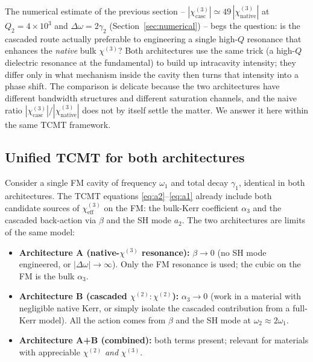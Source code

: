 \documentclass[11pt,a4paper]{article}
\newcommand{\chitwo}{\chi^{(2)}}
\newcommand{\chithree}{\chi^{(3)}}
\newcommand{\Dom}{\Delta\omega}
\begin{document}
The numerical estimate of the previous section -- $|\chithree_\text{casc}|
\simeq 49\,|\chithree_\text{native}|$ at $Q_2=4{\times}10^{3}$ and
$\Dom=2\gamma_2$ (Section~\ref{sec:numerical}) -- begs
the question: is the cascaded route actually preferable to engineering
a single high-$Q$ resonance that enhances the \emph{native} bulk
$\chithree$?  Both architectures use the same trick (a high-$Q$
dielectric resonance at the fundamental) to build up intracavity
intensity; they differ only in what mechanism inside the cavity then
turns that intensity into a phase shift.  The comparison is delicate
because the two architectures have different bandwidth structures and
different saturation channels, and the naive ratio
$|\chithree_\text{casc}|/|\chithree_\text{native}|$ does not by itself
settle the matter.  We answer it here within the same TCMT framework.

\subsection*{Unified TCMT for both architectures}

Consider a single FM cavity of frequency $\omega_1$ and total decay
$\gamma_1$, identical in both architectures.  The TCMT equations
\eqref{eq:a2}--\eqref{eq:a1} already include both candidate sources of
$\chithree_\text{eff}$ on the FM: the bulk-Kerr coefficient $\alpha_3$
and the cascaded back-action via $\beta$ and the SH mode $a_2$.  The
two architectures are limits of the same model:

\begin{itemize}\setlength{\itemsep}{3pt}
  \item \textbf{Architecture A (native-$\chithree$ resonance):}
        $\beta\to 0$ (no SH mode engineered, or $|\Dom|\!\to\!\infty$).
        Only the FM resonance is used; the cubic on the FM is the bulk
        $\alpha_3$.
  \item \textbf{Architecture B (cascaded $\chitwo{:}\chitwo$):}
        $\alpha_3\to 0$ (work in a material with negligible native
        Kerr, or simply isolate the cascaded contribution from a
        full-Kerr model).  All the action comes from $\beta$ and the
        SH mode at $\omega_2\approx 2\omega_1$.
  \item \textbf{Architecture A+B (combined):} both terms present;
        relevant for materials with appreciable $\chitwo$ \emph{and}
        $\chithree$.
\end{itemize}
\end{document}
